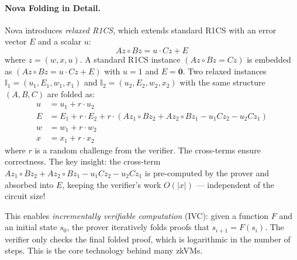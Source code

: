 \paragraph{Nova Folding in Detail.} Nova introduces \emph{relaxed R1CS}, which extends standard R1CS with an error vector $E$ and a scalar $u$:
\[
A z \circ B z = u \cdot C z + E
\]
where $z = (w, x, u)$. A standard R1CS instance $(A z \circ B z = C z)$ is embedded as $(A z \circ B z = u \cdot C z + E)$ with $u=1$ and $E=\mathbf{0}$. Two relaxed instances $\mathbb{I}_1 = (u_1, E_1, w_1, x_1)$ and $\mathbb{I}_2 = (u_2, E_2, w_2, x_2)$ with the same structure $(A,B,C)$ are folded as:
\begin{align*}
u &= u_1 + r \cdot u_2 \\
E &= E_1 + r \cdot E_2 + r \cdot (A z_1 \circ B z_2 + A z_2 \circ B z_1 - u_1 C z_2 - u_2 C z_1) \\
w &= w_1 + r \cdot w_2 \\
x &= x_1 + r \cdot x_2
\end{align*}
where $r$ is a random challenge from the verifier. The cross-terms ensure correctness. The key insight: the cross-term $A z_1 \circ B z_2 + A z_2 \circ B z_1 - u_1 C z_2 - u_2 C z_1$ is pre-computed by the prover and absorbed into $E$, keeping the verifier's work $O(|x|)$ --- independent of the circuit size!

This enables \emph{incrementally verifiable computation} (IVC): given a function $F$ and an initial state $s_0$, the prover iteratively folds proofs that $s_{i+1} = F(s_i)$. The verifier only checks the final folded proof, which is logarithmic in the number of steps. This is the core technology behind many zkVMs.

